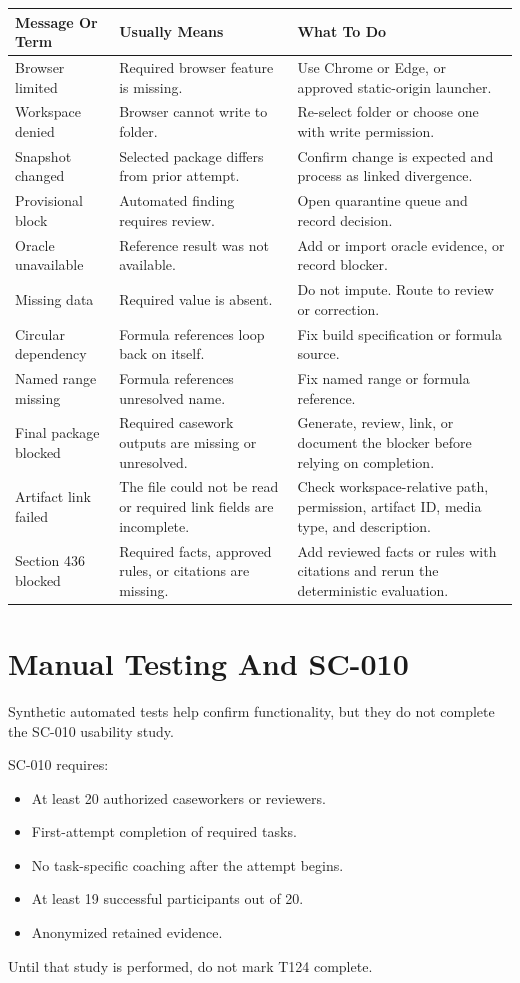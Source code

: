 \begin{longtable}{L{0.28\textwidth}L{0.31\textwidth}L{0.31\textwidth}}
\toprule
\textbf{Message Or Term} & \textbf{Usually Means} & \textbf{What To Do} \\
\midrule
Browser limited & Required browser feature is missing. & Use Chrome or Edge, or approved static-origin launcher. \\
Workspace denied & Browser cannot write to folder. & Re-select folder or choose one with write permission. \\
Snapshot changed & Selected package differs from prior attempt. & Confirm change is expected and process as linked divergence. \\
Provisional block & Automated finding requires review. & Open quarantine queue and record decision. \\
Oracle unavailable & Reference result was not available. & Add or import oracle evidence, or record blocker. \\
Missing data & Required value is absent. & Do not impute. Route to review or correction. \\
Circular dependency & Formula references loop back on itself. & Fix build specification or formula source. \\
Named range missing & Formula references unresolved name. & Fix named range or formula reference. \\
Final package blocked & Required casework outputs are missing or unresolved. & Generate, review, link, or document the blocker before relying on completion. \\
Artifact link failed & The file could not be read or required link fields are incomplete. & Check workspace-relative path, permission, artifact ID, media type, and description. \\
Section 436 blocked & Required facts, approved rules, or citations are missing. & Add reviewed facts or rules with citations and rerun the deterministic evaluation. \\
\bottomrule
\end{longtable}

\chapter{Manual Testing And SC-010}

Synthetic automated tests help confirm functionality, but they do not complete the SC-010 usability study.

SC-010 requires:

\begin{itemize}
  \item At least 20 authorized caseworkers or reviewers.
  \item First-attempt completion of required tasks.
  \item No task-specific coaching after the attempt begins.
  \item At least 19 successful participants out of 20.
  \item Anonymized retained evidence.
\end{itemize}

Until that study is performed, do not mark T124 complete.
